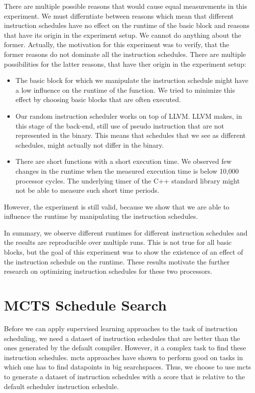 There are multiple possible reasons that would cause equal measurements in this experiment.
We must differntiate between reasons which mean that different instruction schedules have no effect on the runtime of the basic block and reasons that have its origin in the experiment setup.
We cannot do anything about the former.
Actually, the motivation for this experiment was to verify, that the former reasons do not dominate all the instruction schedules.
There are multiple possibilities for the latter reasons, that have ther origin in the experiment setup:
\begin{itemize}
    \item The basic block for which we manipulate the instruction schedule might have a low influence on the runtime of the function.
        We tried to minimize this effect by choosing basic blocks that are often executed.
    \item Our random instruction scheduler works on top of LLVM.
        LLVM makes, in this stage of the back-end, still use of pseudo instruction that are not represented in the binary.
        This means that schedules that we see as different schedules, might actually not differ in the binary.
    \item There are short functions with a short execution time.
        We observed few changes in the runtime when the measured execution time is below 10,000 processor cycles.
        The underlying timer of the C++ standard library might not be able to measure such short time periods.  
\end{itemize}
However, the experiment is still valid, because we show that we are able to influence the runtime by manipulating the instruction schedules.

In summary, we observe different runtimes for different instruction schedules and the results are reproducible over multiple runs.
This is not true for all basic blocks, but the goal of this experiment was to show the existence of an effect of the instruction schedule on the runtime.
These results motivate the further research on optimizing instruction schedules for these two processors.

\section{MCTS Schedule Search}
Before we can apply supervised learning approaches to the task of instruction scheduling, we need a dataset of instruction schedules that are better than the ones generated by the default compiler.
However, it a complex task to find these instruction schedules.
\ac{mcts} approaches have shown to perform good on tasks in which one has to find datapoints in big searchspaces.
Thus, we choose to use \ac{mcts} to generate a dataset of instruction schedules with a score that is relative to the default scheduler instruction schedule.

